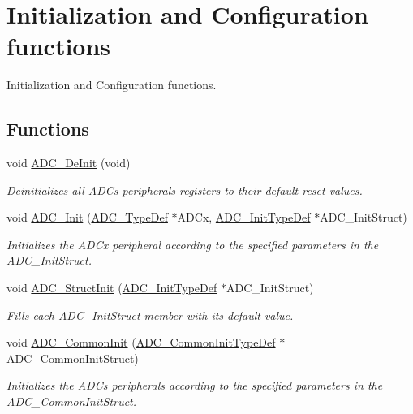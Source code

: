 \hypertarget{group___a_d_c___group1}{}\section{Initialization and Configuration functions}
\label{group___a_d_c___group1}


Initialization and Configuration functions.  


\subsection*{Functions}
\begin{DoxyCompactItemize}
\item 
void \hyperlink{group___a_d_c___group1_ga1962afdd9eebe5c896bbba2e4f26fe09}{A\+D\+C\+\_\+\+De\+Init} (void)
\begin{DoxyCompactList}\small\item\em Deinitializes all A\+D\+Cs peripherals registers to their default reset values. \end{DoxyCompactList}\item 
void \hyperlink{group___a_d_c___group1_gabbab6038cf8691404350625e477254f9}{A\+D\+C\+\_\+\+Init} (\hyperlink{struct_a_d_c___type_def}{A\+D\+C\+\_\+\+Type\+Def} $\ast$A\+D\+Cx, \hyperlink{struct_a_d_c___init_type_def}{A\+D\+C\+\_\+\+Init\+Type\+Def} $\ast$A\+D\+C\+\_\+\+Init\+Struct)
\begin{DoxyCompactList}\small\item\em Initializes the A\+D\+Cx peripheral according to the specified parameters in the A\+D\+C\+\_\+\+Init\+Struct. \end{DoxyCompactList}\item 
void \hyperlink{group___a_d_c___group1_ga6c6e754d1d0a98d56e465efaf73272ec}{A\+D\+C\+\_\+\+Struct\+Init} (\hyperlink{struct_a_d_c___init_type_def}{A\+D\+C\+\_\+\+Init\+Type\+Def} $\ast$A\+D\+C\+\_\+\+Init\+Struct)
\begin{DoxyCompactList}\small\item\em Fills each A\+D\+C\+\_\+\+Init\+Struct member with its default value. \end{DoxyCompactList}\item 
void \hyperlink{group___a_d_c___group1_ga5803f6581a9cd7e90b6e637067102d94}{A\+D\+C\+\_\+\+Common\+Init} (\hyperlink{struct_a_d_c___common_init_type_def}{A\+D\+C\+\_\+\+Common\+Init\+Type\+Def} $\ast$A\+D\+C\+\_\+\+Common\+Init\+Struct)
\begin{DoxyCompactList}\small\item\em Initializes the A\+D\+Cs peripherals according to the specified parameters in the A\+D\+C\+\_\+\+Common\+Init\+Struct. \end{DoxyCompactList}\item 

\end{DoxyCompactItemize}
